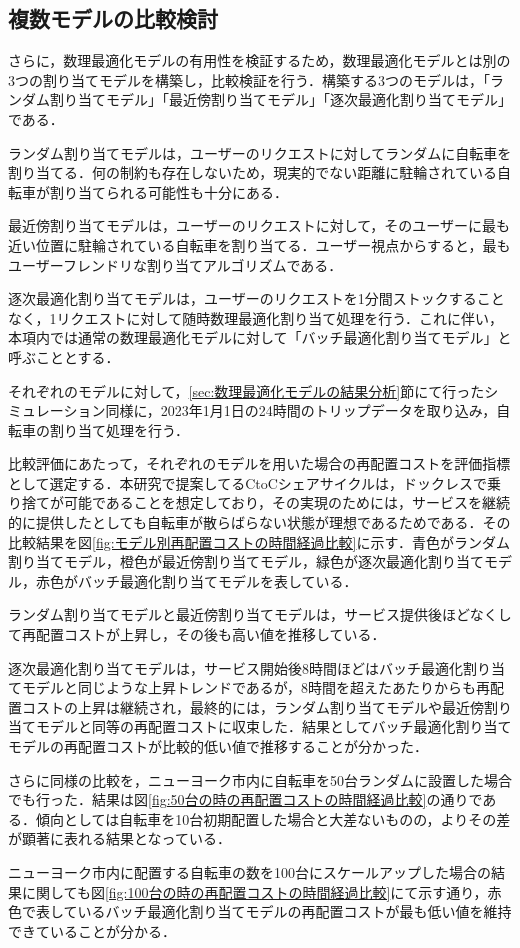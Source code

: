           
      \subsection{複数モデルの比較検討}
        \label{sec:複数モデルの比較検討}
          \par さらに，数理最適化モデルの有用性を検証するため，数理最適化モデルとは別の3つの割り当てモデルを構築し，比較検証を行う．構築する3つのモデルは，「ランダム割り当てモデル」「最近傍割り当てモデル」「逐次最適化割り当てモデル」である．
          \par ランダム割り当てモデルは，ユーザーのリクエストに対してランダムに自転車を割り当てる．何の制約も存在しないため，現実的でない距離に駐輪されている自転車が割り当てられる可能性も十分にある．
          \par 最近傍割り当てモデルは，ユーザーのリクエストに対して，そのユーザーに最も近い位置に駐輪されている自転車を割り当てる．ユーザー視点からすると，最もユーザーフレンドリな割り当てアルゴリズムである．
          \par 逐次最適化割り当てモデルは，ユーザーのリクエストを1分間ストックすることなく，1リクエストに対して随時数理最適化割り当て処理を行う．これに伴い，本項内では通常の数理最適化モデルに対して「バッチ最適化割り当てモデル」と呼ぶこととする．
          \par それぞれのモデルに対して，\ref{sec:数理最適化モデルの結果分析}節にて行ったシミュレーション同様に，2023年1月1日の24時間のトリップデータを取り込み，自転車の割り当て処理を行う．
          \par 比較評価にあたって，それぞれのモデルを用いた場合の再配置コストを評価指標として選定する．本研究で提案してるCtoCシェアサイクルは，ドックレスで乗り捨てが可能であることを想定しており，その実現のためには，サービスを継続的に提供したとしても自転車が散らばらない状態が理想であるためである．その比較結果を図\ref{fig:モデル別再配置コストの時間経過比較}に示す．青色がランダム割り当てモデル，橙色が最近傍割り当てモデル，緑色が逐次最適化割り当てモデル，赤色がバッチ最適化割り当てモデルを表している．
          \par ランダム割り当てモデルと最近傍割り当てモデルは，サービス提供後ほどなくして再配置コストが上昇し，その後も高い値を推移している．
          \par 逐次最適化割り当てモデルは，サービス開始後8時間ほどはバッチ最適化割り当てモデルと同じような上昇トレンドであるが，8時間を超えたあたりからも再配置コストの上昇は継続され，最終的には，ランダム割り当てモデルや最近傍割り当てモデルと同等の再配置コストに収束した．結果としてバッチ最適化割り当てモデルの再配置コストが比較的低い値で推移することが分かった．
          \par さらに同様の比較を，ニューヨーク市内に自転車を50台ランダムに設置した場合でも行った．結果は図\ref{fig:50台の時の再配置コストの時間経過比較}の通りである．傾向としては自転車を10台初期配置した場合と大差ないものの，よりその差が顕著に表れる結果となっている．
          \par ニューヨーク市内に配置する自転車の数を100台にスケールアップした場合の結果に関しても図\ref{fig:100台の時の再配置コストの時間経過比較}にて示す通り，赤色で表しているバッチ最適化割り当てモデルの再配置コストが最も低い値を維持できていることが分かる．

